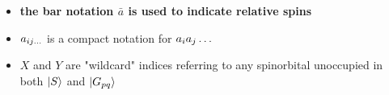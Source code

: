 \documentclass[./thesis.tex]{subfiles}
\begin{document}
\begin{table}
\begin{center}
\end{center}
\begin{itemize}
\item
\textbf{the bar notation $\bar a$ is used to indicate relative spins}
\item
$a_{ij\ldots}$ is a compact notation for $a_{i} a_{j} \ldots$
\item
$X$ and $Y$ are "wildcard" indices referring to any spinorbital unoccupied in both $\ket S$ and $\ket {G_{pq}}$ 
\end{itemize}
\end{table}
\end{document}
